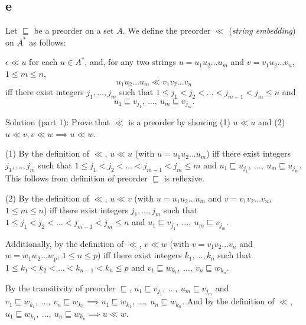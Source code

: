 \documentclass[12pt]{article}
\begin{document}
\subsection*{e}

Let $\sqsubseteq$ be a preorder on a set $A$. We define the
preorder $\ll$ ({\it string embedding\/})
on $A^{*}$ as follows:

\medskip\noindent
$\epsilon \ll u$ for each $u\in A^{*}$, and,
for any two strings $u=u_{1}u_{2}\ldots u_{m}$ and
$v=v_{1}u_{2}\ldots v_{n}$, $1\leq m\leq n$,
$$u_{1}u_{2}\ldots u_{m} \ll v_{1}v_{2}\ldots v_{n}$$
iff there exist  integers $j_{1},\ldots,j_{m}$ such that
$1\leq j_{1} < j_{2} < \ldots < j_{m-1} < j_{m} \leq n$ and
$$u_{1} \sqsubseteq v_{j_{1}},\ \ldots,\ u_{m} \sqsubseteq v_{j_{m}}.$$

\medskip

Solution (part 1): Prove that $\ll$ is a preorder by showing (1) $u \ll u$ and (2) $u \ll v, v \ll w \implies u \ll w$.

\medskip

(1) By the definition of $\ll$, $u \ll u$ (with $u=u_{1}u_{2}\ldots u_{m}$) iff there exist integers $j_{1},\ldots,j_{m}$ such that
$1\leq j_{1} < j_{2} < \ldots < j_{m-1} < j_{m} \leq m$ and
$u_{1} \sqsubseteq u_{j_{1}},\ \ldots,\ u_{m} \sqsubseteq u_{j_{m}}.$ This follows from definition of preorder $\sqsubseteq $
is reflexive.

\medskip

(2) By the definition of $\ll$, $u \ll v$ (with $u=u_{1}u_{2}\ldots u_{m}$ and
$v=v_{1}v_{2}\ldots v_{n}$, $1\leq m\leq n$) iff there exist integers $j_{1},\ldots,j_{m}$ such that
$1\leq j_{1} < j_{2} < \ldots < j_{m-1} < j_{m} \leq n$ and
$u_{1} \sqsubseteq v_{j_{1}},\ \ldots,\ u_{m} \sqsubseteq v_{j_{m}}.$

\medskip
Additionally, by the definition of $\ll$, $v \ll w$ (with $v=v_{1}v_{2}\ldots v_{n}$ and
$w=w_{1}w_{2}\ldots w_{p}$, $1\leq n\leq p$) iff there exist integers $k_{1},\ldots,k_{n}$ such that
$1\leq k_{1} < k_{2} < \ldots < k_{n-1} < k_{n} \leq p$ and
$v_{1} \sqsubseteq w_{k_{1}},\ \ldots,\ v_{n} \sqsubseteq w_{k_{n}}.$

\medskip
By the transitivity of preorder $\sqsubseteq $, $u_{1} \sqsubseteq v_{j_{1}},\ \ldots,\ u_{m} \sqsubseteq v_{j_{m}}$
and $v_{1} \sqsubseteq w_{k_{1}},\ \ldots,\ v_{n} \sqsubseteq w_{k_{n}} \implies u_{1} \sqsubseteq w_{k_{1}},\ \ldots,\ u_{n} \sqsubseteq w_{k_{n}}$.
And by the definition of $\ll$, $u_{1} \sqsubseteq w_{k_{1}},\ \ldots,\ u_{n} \sqsubseteq w_{k_{n}} \implies u \ll w$.
\end{document}
